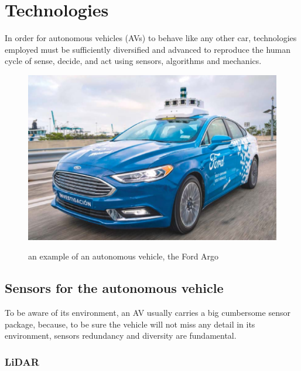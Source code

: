 \section{Technologies}


In order for autonomous vehicles (AVs) to behave like any other car, technologies employed must be sufficiently diversified and advanced to reproduce the human cycle of sense, decide, and act using sensors, algorithms and mechanics.

\begin{center}
    \begin{figure}[ht!]
        \centering
        
        \includegraphics[width=467px, keepaspectratio]{imports/autonomous_vehicle.png}
        
        \caption{an example of an autonomous vehicle, the Ford Argo}  \cite{mccormick_self-driving_2019}
    \end{figure}
\end{center}

\subsection{Sensors for the autonomous vehicle}

To be aware of its environment, an AV usually carries a big cumbersome sensor package, because, to be sure the vehicle will not miss any detail in its environment, sensors redundancy and diversity are fundamental.

\subsubsection{LiDAR}


